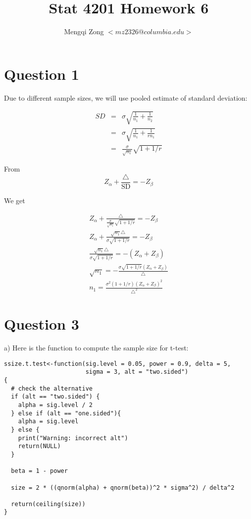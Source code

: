 \documentclass[12pt]{article}
\title{Stat 4201 Homework 6}
\author{Mengqi Zong $<mz2326@columbia.edu>$}
\begin{document}
\maketitle

\setlength{\parindent}{0in}

\section*{Question 1}

Due to different sample sizes, we will use pooled estimate of standard
deviation:

\begin{eqnarray*}
SD
&=& \sigma \sqrt {\frac {1}{n_1} + \frac{1}{n_2}} \\
&=& \sigma \sqrt {\frac {1}{n_1} + \frac{1}{rn_1}} \\
&=& \frac {\sigma}{\sqrt {n_1}} \sqrt {1 + 1 / r} 
\end{eqnarray*}

From
\begin{equation*}
Z_{\alpha} + \frac {\triangle}{\text {SD}} = - Z_{\beta}
\end{equation*}

We get

\begin{eqnarray*}
Z_{\alpha} + \frac {\triangle}{\frac {\sigma}{\sqrt {n_1}} \sqrt {1 +
    1 / r}} = - Z_{\beta} \\
Z_{\alpha} + \frac {\sqrt {n_1} \triangle}{\sigma \sqrt {1 +
    1 / r}} = - Z_{\beta} \\
\frac {\sqrt {n_1} \triangle}{\sigma \sqrt {1 + 1 / r}} = -
(Z_{\alpha} + Z_{\beta}) \\
\sqrt {n_1} = - \frac {\sigma \sqrt {1 + 1 / r}(Z_{\alpha} +
  Z_{\beta})}{\triangle} \\
n_1= \frac {\sigma^2 (1 + 1 / r) (Z_{\alpha} +
  Z_{\beta})^2}{\triangle^2}
\end{eqnarray*}

\section*{Question 3}

a) Here is the function to compute the sample size for t-test:

\begin{verbatim}
ssize.t.test<-function(sig.level = 0.05, power = 0.9, delta = 5,
                       sigma = 3, alt = "two.sided") 
{
  # check the alternative
  if (alt == "two.sided") {
    alpha = sig.level / 2 
  } else if (alt == "one.sided"){
    alpha = sig.level
  } else {
    print("Warning: incorrect alt")
    return(NULL)
  }

  beta = 1 - power
  
  size = 2 * ((qnorm(alpha) + qnorm(beta))^2 * sigma^2) / delta^2

  return(ceiling(size))  
}
\end{verbatim}
\end{document}
